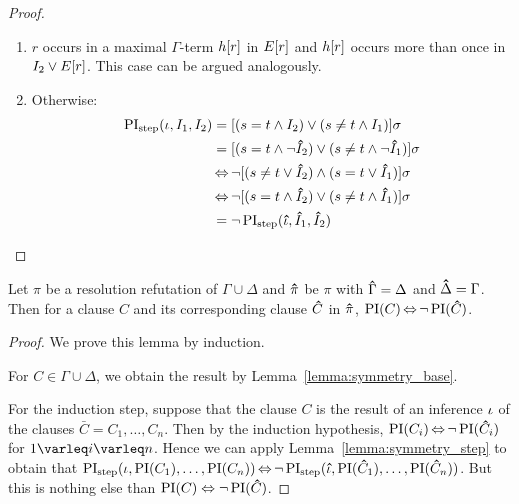 \begin{proof}
\begin{itemize}
\begin{enumerate}
						\item $r$ occurs in a maximal $\Gamma$-term $h[r]$ in $E[r]$ and $h[r]$ occurs more than once in $I_2 \lor E[r]$.
							This case can be argued analogously.
						\item Otherwise:
							\begin{align*}
								\operatorname{PI}_{\mathrm{step}}(\iota, I_1, I_2) &= [ ( s=t \land I_2 ) \lor (s\neq t \land I_1) ]\sigma \\
														&= [ ( s=t \land \lnot \bm\hat{I}_2 ) \lor (s\neq t \land \lnot \bm\hat{I}_1) ]\sigma \\
														&\operatorname{\Leftrightarrow} \lnot [ ( s\neq t \lor \bm\hat{I}_2 ) \land (s=t \lor \bm\hat{I}_1) ]\sigma \\
														&\operatorname{\Leftrightarrow} \lnot [ ( s=t \land \bm\hat{I}_2 ) \lor (s\neq t \land \bm\hat{I}_1) ]\sigma \\
													 &= \lnot \operatorname{PI}_{\mathrm{step}}(\bm\hat{\iota}, \bm\hat{I}_1, \bm\hat{I}_2)
								\qedhere
							\end{align*}
					\end{enumerate}


	\end{itemize}

\end{proof}



\begin{lemma}
	\label{lemma:symmetry}
	Let $\pi$ be a resolution refutation of $\Gamma \cup \Delta$ and
	$\bm\hat{\pi}$ be $\pi$ with $\bm\hat{\Gamma} = \Delta$ and $\bm\hat{\Delta} = \Gamma$.
	Then for a clause $C$ and its corresponding clause $\bm\hat{C}$ in $\bm\hat{\pi}$, $\operatorname{PI}(C) \operatorname{\Leftrightarrow} \lnot \operatorname{PI}(\bm\hat{C})$.
\end{lemma}
\begin{proof}
	We prove this lemma by induction.

	For $C \in \Gamma \cup \Delta$, we obtain the result by Lemma~\ref{lemma:symmetry_base}.


	For the induction step, suppose that the clause $C$ is the result of an inference $\iota$ of the clauses $\bar C = C_1, \dots, C_n$.
	Then by the induction hypothesis, $\operatorname{PI}(C_i) \operatorname{\Leftrightarrow} \lnot \operatorname{PI}(\bm\hat{C}_i)$ for $1 \varleq i \varleq n$. 
	Hence we can apply Lemma~\ref{lemma:symmetry_step} to obtain that $\operatorname{PI}_{\mathrm{step}}(\iota, \operatorname{PI}(C_1), \dots, \operatorname{PI}(C_n)) \operatorname{\Leftrightarrow} \lnot \operatorname{PI}_{\mathrm{step}}(\bm\hat{\iota}, \operatorname{PI}(\bm\hat{C}_1), \dots, \operatorname{PI}(\bm\hat{C}_n))$.
	But this is nothing else than $\operatorname{PI}(C) \;{\operatorname{\Leftrightarrow}}\; \lnot \operatorname{PI}(\bm\hat{C})$.
\end{proof}


